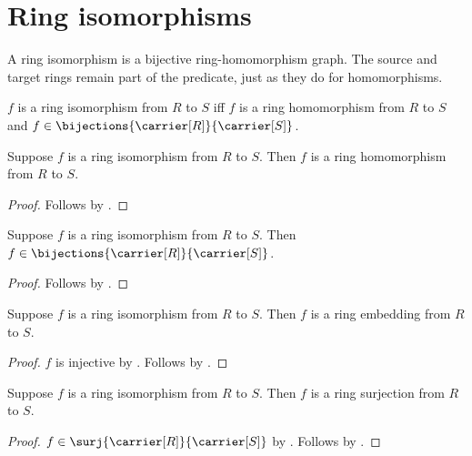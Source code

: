


\section{Ring isomorphisms}

A ring isomorphism is a bijective ring-homomorphism graph.  The source and
target rings remain part of the predicate, just as they do for
homomorphisms.

\begin{definition}\label{ring_isomorphism}
    $f$ is a ring isomorphism from $R$ to $S$ iff
        $f$ is a ring homomorphism from $R$ to $S$ and
        $f\in\bijections{\carrier[R]}{\carrier[S]}$.
\end{definition}

\begin{proposition}\label{ring_isomorphism_is_hom}
    Suppose $f$ is a ring isomorphism from $R$ to $S$.
    Then $f$ is a ring homomorphism from $R$ to $S$.
\end{proposition}
\begin{proof}
    Follows by .
\end{proof}

\begin{proposition}\label{ring_isomorphism_is_bijection}
    Suppose $f$ is a ring isomorphism from $R$ to $S$.
    Then $f\in\bijections{\carrier[R]}{\carrier[S]}$.
\end{proposition}
\begin{proof}
    Follows by .
\end{proof}

\begin{corollary}\label{ring_isomorphism_is_embedding}
    Suppose $f$ is a ring isomorphism from $R$ to $S$.
    Then $f$ is a ring embedding from $R$ to $S$.
\end{corollary}
\begin{proof}
    $f$ is injective by
        .
    Follows by
        .
\end{proof}

\begin{corollary}\label{ring_isomorphism_is_surjection}
    Suppose $f$ is a ring isomorphism from $R$ to $S$.
    Then $f$ is a ring surjection from $R$ to $S$.
\end{corollary}
\begin{proof}
    $f\in\surj{\carrier[R]}{\carrier[S]}$ by
        .
    Follows by
        .
\end{proof}

